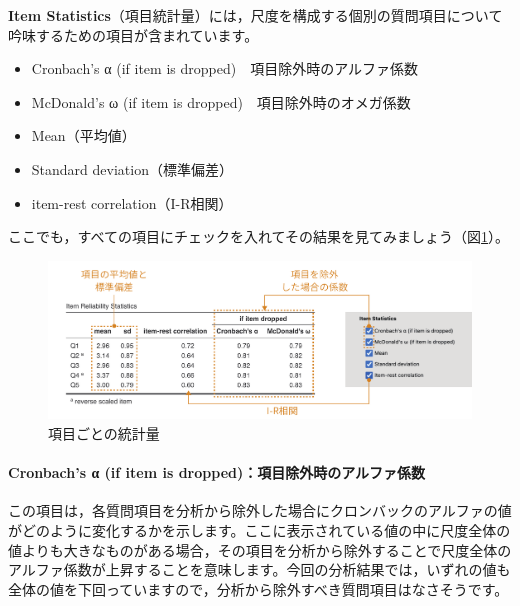 \documentclass[
  12pt,
  a5jpaper,
  lualatex, ja=standard]{bxjsbook}
\providecommand{\tightlist}{%
  \setlength{\itemsep}{0pt}\setlength{\parskip}{0pt}}
\newenvironment{jmvsettings}{%
	\begin{center}%
	\begin{tcolorbox}[%
		title=設定項目,
		colframe=gmoji,
		colbacktitle=gmoji,
		colback=gmoji!2!white,
		breakable,
		width=.9\textwidth,
		]\small\addtolength{\leftmargini}{-3\labelsep}%
	}%
	{\end{tcolorbox}\end{center}}
\begin{document}
\textbf{Item Statistics}（項目統計量）には，尺度を構成する個別の質問項目について吟味するための項目が含まれています。

\begin{jmvsettings}

\begin{itemize}
\tightlist
\item
  Cronbach's α (if item is dropped)　項目除外時のアルファ係数
\item
  McDonald's ω (if item is dropped)　項目除外時のオメガ係数
\item
  Mean（平均値）
\item
  Standard deviation（標準偏差）
\item
  item-rest correlation（I-R相関）
\end{itemize}

\end{jmvsettings}

ここでも，すべての項目にチェックを入れてその結果を見てみましょう（図\ref{fig:factor-reliability-item-statistics}）。

\begin{figure}[!ht]

{\centering \includegraphics[width=1\linewidth]{images/factor/reliability-item-statistics} 

}

\caption{項目ごとの統計量}\label{fig:factor-reliability-item-statistics}
\end{figure}

\hypertarget{cronbachs-ux3b1-if-item-is-droppedux9805ux76eeux9664ux5916ux6642ux306eux30a2ux30ebux30d5ux30a1ux4fc2ux6570}{%
\paragraph{Cronbach's α (if item is dropped)：項目除外時のアルファ係数}\label{cronbachs-ux3b1-if-item-is-droppedux9805ux76eeux9664ux5916ux6642ux306eux30a2ux30ebux30d5ux30a1ux4fc2ux6570}}

この項目は，各質問項目を分析から除外した場合にクロンバックのアルファの値がどのように変化するかを示します。ここに表示されている値の中に尺度全体の値よりも大きなものがある場合，その項目を分析から除外することで尺度全体のアルファ係数が上昇することを意味します。今回の分析結果では，いずれの値も全体の値を下回っていますので，分析から除外すべき質問項目はなさそうです。
\end{document}
